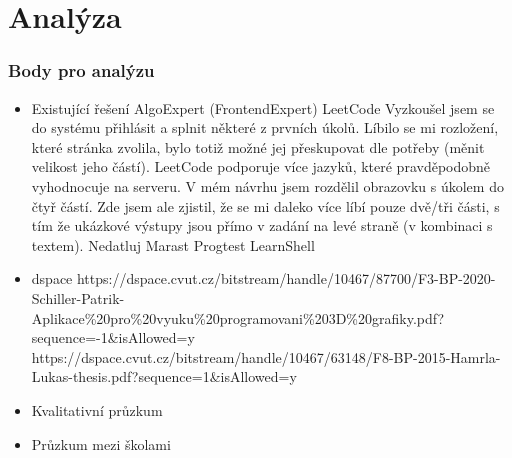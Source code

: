
\chapter{Analýza}

\subsection{Body pro analýzu}
\begin{itemize}
    \item Existující řešení
    \subitem AlgoExpert (FrontendExpert)
    \subitem LeetCode
    Vyzkoušel jsem se do systému přihlásit a splnit některé z prvních úkolů. Líbilo se mi rozložení, které stránka zvolila,
    bylo totiž možné jej přeskupovat dle potřeby (měnit velikost jeho částí). LeetCode podporuje více jazyků, které pravděpodobně
    vyhodnocuje na serveru. V mém návrhu jsem rozdělil obrazovku s úkolem do čtyř částí. Zde jsem ale zjistil, že se mi daleko
    více líbí pouze dvě/tři části, s tím že ukázkové výstupy jsou přímo v zadání na levé straně (v kombinaci s textem).
    \subitem Nedatluj %
    \subitem Marast
    \subitem Progtest
    \subitem LearnShell %
    \item dspace
    \subitem https://dspace.cvut.cz/bitstream/handle/10467/87700/F3-BP-2020-Schiller-Patrik-Aplikace\%20pro\%20vyuku\%20programovani\%203D\%20grafiky.pdf?sequence=-1\&isAllowed=y
    \subitem https://dspace.cvut.cz/bitstream/handle/10467/63148/F8-BP-2015-Hamrla-Lukas-thesis.pdf?sequence=1\&isAllowed=y
    \item Kvalitativní průzkum
    \item Průzkum mezi školami
\end{itemize}
